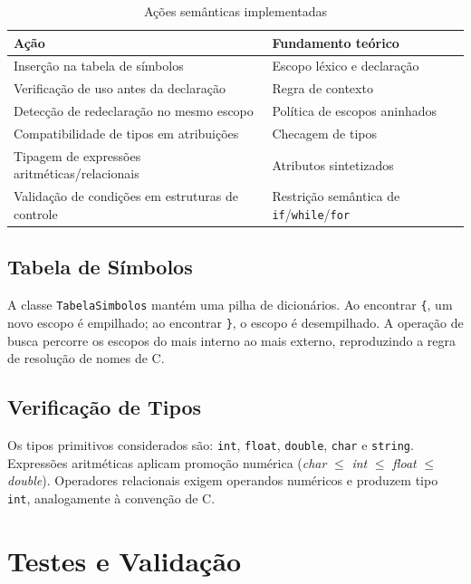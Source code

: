 \documentclass[12pt,a4paper]{article}
\begin{document}
\begin{table}[h]
  \centering
  \caption{Ações semânticas implementadas}
  \begin{tabular}{@{}p{}p{}@{}}
    \toprule
    \textbf{Ação} & \textbf{Fundamento teórico} \\
    \midrule
    Inserção na tabela de símbolos & Escopo léxico e declaração \\
    Verificação de uso antes da declaração & Regra de contexto \\
    Detecção de redeclaração no mesmo escopo & Política de escopos aninhados \\
    Compatibilidade de tipos em atribuições & Checagem de tipos \\
    Tipagem de expressões aritméticas/relacionais & Atributos sintetizados \\
    Validação de condições em estruturas de controle & Restrição semântica de \texttt{if}/\texttt{while}/\texttt{for} \\
    \bottomrule
  \end{tabular}
\end{table}

\subsection{Tabela de Símbolos}

A classe \texttt{TabelaSimbolos} mantém uma pilha de dicionários. Ao encontrar
\texttt{\{}, um novo escopo é empilhado; ao encontrar \texttt{\}}, o escopo é
desempilhado. A operação de busca percorre os escopos do mais interno ao mais
externo, reproduzindo a regra de resolução de nomes de C.

\subsection{Verificação de Tipos}

Os tipos primitivos considerados são: \texttt{int}, \texttt{float}, \texttt{double},
\texttt{char} e \texttt{string}. Expressões aritméticas aplicam promoção numérica
(\textit{char} $\leq$ \textit{int} $\leq$ \textit{float} $\leq$ \textit{double}).
Operadores relacionais exigem operandos numéricos e produzem tipo \texttt{int},
analogamente à convenção de C.

\section{Testes e Validação}
\end{document}
